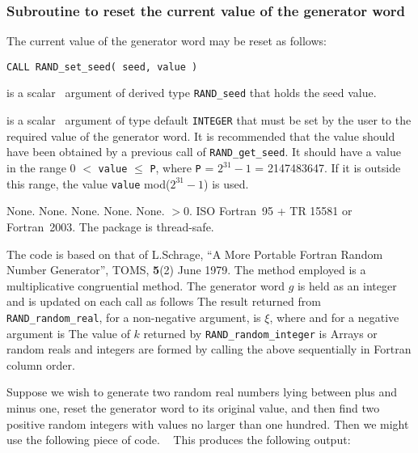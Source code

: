 \documentclass{galahad}
\newcommand{\packagename}{RAND}
\begin{document}

\subsubsection{Subroutine to reset the current value of the generator word}
The current value of the generator word may be reset as follows:
\vspace*{1mm}

\hskip0.5in
{\tt CALL \packagename\_set\_seed( seed, value )}

\vspace*{-2mm}
\begin{description}
 is a scalar \intentout\ argument of derived type
{\tt \packagename\_seed}  that holds the seed value.

 is a scalar \intentin\ argument of type default
{\tt INTEGER} that
 must be set by the user to the required value of the generator word. It
 is recommended that the value
 should have been obtained by a previous call of {\tt \packagename\_get\_seed}.
 It should have a value in the range 0 $<$ {\tt value} $\leq$ {\tt P},
 where {\tt P} =
 $2^{31}  - 1$  = 2147483647. If it is outside this range, the value
 {\tt value} mod($2^{31}  - 1$) is used.

\end{description}


\galgeneral

\galcommon None.
\galworkspace None.
\galroutines None.
\galmodules None.
\galio None.
 $> 0$.
\galportability ISO Fortran~95 + TR 15581 or Fortran~2003.
The package is thread-safe.


\galmethod
The code is based on that of L.Schrage, ``A More
 Portable Fortran Random Number Generator'', TOMS, {\bf 5}(2) June 1979.
 The method employed is a multiplicative congruential method. The
 generator word $g$ is held as an integer and is updated on each call
 as follows
 The result returned from {\tt \packagename\_random\_real},
 for a non-negative argument, is $\xi$, where
 and for a negative argument is
 The value of $k$ returned by {\tt \packagename\_random\_integer} is
Arrays or random reals and integers are formed by calling the above
sequentially in Fortran column order.


\galexample
Suppose we wish to generate two random real numbers lying between plus
and minus one, reset the generator word to its original value, and then
find two positive random integers with values no larger than one hundred.
Then we might use the following piece of code.
{\tt \small
\VerbatimInput{\packageexample}
}
This produces the following output:
{\tt \small
\VerbatimInput{\packageresults}
}
\end{document}
